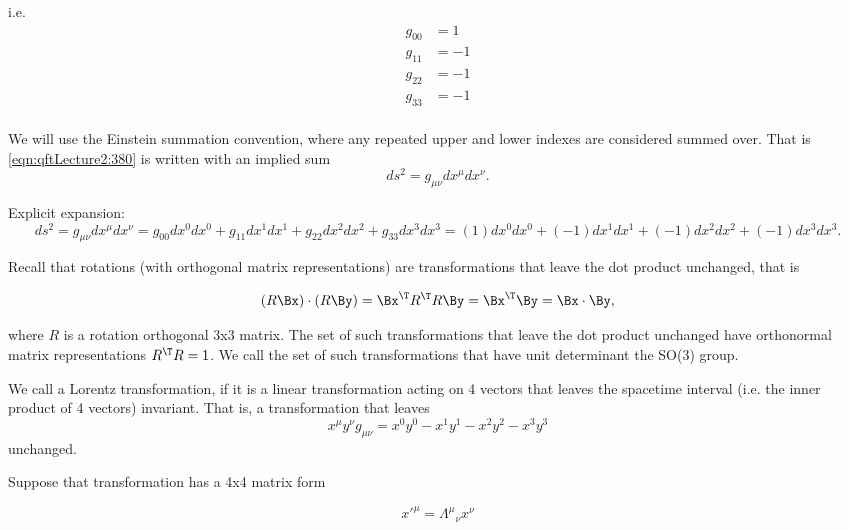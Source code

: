 i.e.
\begin{dmath}\label{eqn:qftLecture2:420}
\begin{aligned}
g_{00} &= 1 \\
g_{11} &= -1 \\
g_{22} &= -1 \\
g_{33} &= -1 \\
\end{aligned}
\end{dmath}

We will use the Einstein summation convention, where any repeated upper and lower indexes are considered summed over.  That is \cref{eqn:qftLecture2:380} is written with an implied sum
\begin{dmath}\label{eqn:qftLecture2:440}
ds^2 = g_{\mu\nu} dx^\mu dx^\nu.
\end{dmath}

Explicit expansion:
\begin{dmath}\label{eqn:qftLecture2:460}
ds^2 = g_{\mu\nu} dx^\mu dx^\nu
=
g_{00} dx^0 dx^0
+g_{11} dx^1 dx^1
+g_{22} dx^2 dx^2
+g_{33} dx^3 dx^3
=
(1) dx^0 dx^0
+ (-1) dx^1 dx^1
+ (-1) dx^2 dx^2
+ (-1) dx^3 dx^3.
\end{dmath}

Recall that rotations (with orthogonal matrix representations) are transformations that leave the dot product unchanged, that is

\begin{dmath}\label{eqn:qftLecture2:480}
(R \Bx) \cdot (R \By)
= \Bx^\T R^\T R \By
= \Bx^\T \By
= \Bx \cdot \By,
\end{dmath}

where \( R \) is a rotation orthogonal 3x3 matrix.  The set of such transformations that leave the dot product unchanged have orthonormal matrix representations \( R^\T R = 1 \).  We call the set of such transformations that have unit determinant the SO(3) group.

We call a Lorentz transformation, if it is a linear transformation acting on 4 vectors that leaves the spacetime interval (i.e. the inner product of 4 vectors) invariant.  That is, a transformation that leaves
\begin{dmath}\label{eqn:qftLecture2:500}
x^\mu y^\nu g_{\mu\nu} = x^0 y^0 - x^1 y^1 - x^2 y^2 - x^3 y^3
\end{dmath}
unchanged.

Suppose that transformation has a 4x4 matrix form

\begin{dmath}\label{eqn:qftLecture2:520}
{x'}^\mu = {\Lambda^\mu}_\nu x^\nu
\end{dmath}

